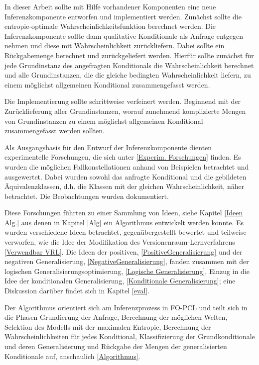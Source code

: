 \documentclass[a4paper, 11pt]{book}
\begin{document}
{In dieser Arbeit sollte mit Hilfe vorhandener Komponenten eine neue Inferenzkomponente entworfen und implementiert werden. Zunächst sollte die entropie-optimale Wahrscheinlichkeitsfunktion berechnet werden. Die Inferenzkomponente sollte dann qualitative Konditionale als Anfrage entgegen nehmen und diese mit Wahrscheinlichkeit zurückliefern. Dabei sollte ein Rückgabemenge berechnet und zurückgeliefert werden. Hierfür sollte zunächst für jede Grundinstanz des angefragten Konditionals die Wahrscheinlichkeit berechnet und alle Grundinstanzen, die die gleiche bedingten Wahrscheinlichkeit liefern, zu einem möglichst allgemeinen Konditional zusammengefasst werden. 

Die Implementierung sollte schrittweise verfeinert werden. Beginnend mit der Zurücklieferung aller Grundinstanzen, worauf zunehmend komplizierte Mengen von Grundinstanzen zu einem möglichst allgemeinen Konditional zusammengefasst werden sollten. 

Als Ausgangsbasis für den Entwurf der Inferenzkomponente dienten experimentelle Forschungen, die sich unter \ref{Experim. Forschungen} finden. Es wurden die möglichen Fallkonstellationen anhand von Beispielen betrachtet und ausgewertet. Dabei wurden sowohl das anfragte Konditional und die gebildeten Äquivalenzklassen, d.h.  die Klassen mit der gleichen Wahrscheinlichkeit, näher betrachtet. Die Beobachtungen wurden dokumentiert. 

Diese Forschungen führten zu einer Sammlung von Ideen, siehe Kapitel \ref{Ideen Alg.} aus denen in Kapitel \ref{Alg} ein Algorithmus entwickelt werden konnte. Es wurden verschiedene Ideen betrachtet, gegenübergestellt bewertet und teilweise verworfen, wie die Idee der Modifikation des Versionenraum-Lernverfahrens \ref{Verwendbar VRL}. Die Ideen der positiven, \ref{PositiveGeneralisierung} und der negativen Generalisierung, \ref{NegativeGeneralisierung}, fanden zusammen mit der logischen Generalisierungsoptimierung, \ref{Logische Generalisierung}, Einzug in die Idee der konditionalen Generalisierung, \ref{Konditionale Generalisierung}; eine Diskussion darüber findet sich in Kapitel \ref{eval}.

Der Algorithmus orientiert sich am Inferenzprozess in FO-PCL und teilt sich in die Phasen Grundierung der Anfrage, Berechnung der möglichen Welten, Selektion des Modells mit der maximalen Entropie, Berechnung der Wahrscheinlichkeiten für jedes Konditional, Klassifizierung der Grundkonditionale und deren Generalisierung und Rückgabe der Mengen der generalisierten Konditionale auf, anschaulich \ref{Algorithmus}.

}
\end{document}
